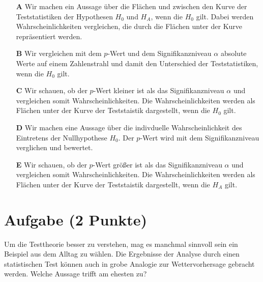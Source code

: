 \documentclass[a4paper, 9pt]{scrartcl}\usepackage[]{graphicx}\usepackage[]{xcolor}
\begin{document}
\begin{enumerate}
\item [\textbf{A} \msquare] Wir machen ein Aussage über die Flächen und zwischen den Kurve der Teststatistiken der Hypothesen $H_0$ und $H_A$, wenn die $H_0$ gilt. Dabei werden Wahrscheinlichkeiten vergleichen, die durch die Flächen unter der Kurve repräsentiert werden.
\item [\textbf{B} \msquare] Wir vergleichen mit dem $p$-Wert und dem Signifikanzniveau $\alpha$ absolute Werte auf einem Zahlenstrahl und damit den Unterschied der Teststatistiken, wenn die $H_0$ gilt.
\item [\textbf{C} \msquare] Wir schauen, ob der $p$-Wert kleiner ist als das Signifikanzniveau $\alpha$ und vergleichen somit Wahrscheinlichkeiten. Die Wahrscheinlichkeiten werden als Flächen unter der Kurve der Teststaistik dargestellt, wenn die $H_0$ gilt.
\item [\textbf{D} \msquare] Wir machen eine Aussage über die indivduelle Wahrscheinlichkeit des Eintretens der Nullhypothese $H_0$. Der $p$-Wert wird mit dem Signifikanzniveau verglichen und bewertet.
\item [\textbf{E} \msquare] Wir schauen, ob der $p$-Wert größer ist als das Signifikanzniveau $\alpha$ und vergleichen somit Wahrscheinlichkeiten. Die Wahrscheinlichkeiten werden als Flächen unter der Kurve der Teststaistik dargestellt, wenn die $H_A$ gilt.
\end{enumerate}

\section{Aufgabe \hfill (2 Punkte)}



Um die Testtheorie besser zu verstehen, mag es manchmal sinnvoll sein ein Beispiel aus dem Alltag zu wählen. Die Ergebnisse der Analyse durch einen statistischen Test können auch in grobe Analogie zur Wettervorhersage gebracht werden. Welche Aussage trifft am ehesten zu?
\end{document}
